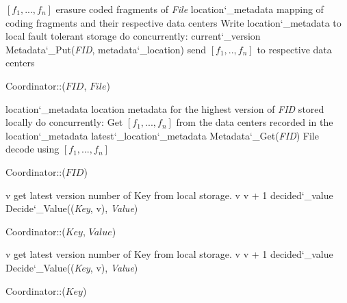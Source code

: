 
\begin{algorithm}
  \DontPrintSemicolon
  $[f_1, ..., f_n]$ \LAR erasure coded fragments of {\em File}\;
  location\char`_metadata \LAR mapping of coding fragments and their respective data centers\;
  Write location\char`_metadata to local fault tolerant storage\;
  do concurrently:\;
  current\char`_version \LAR Metadata\char`_Put({\em FID}, metadata\char`_location)\;
  send $[f_1, .., f_n]$ to respective data centers\;
   {
  } 
  \caption{Coordinator::($FID$, $File$) }
  \label{alg:coordinator}
\end{algorithm}

\begin{algorithm}
  \DontPrintSemicolon
  location\char`_metadata \LAR location metadata for the highest version of {\em FID} stored locally\;
  do concurrently:\;
  Get $[f_1, ..., f_n]$ from the data centers recorded in the location\char`_metadata\;
  latest\char`_location\char`_metadata \LAR Metadata\char`_Get({\em FID})\;
   {
    File \LAR decode using $[f_1, ..., f_n]$\;
    \;
  } 
  \caption{Coordinator::($FID$) }
  \label{alg:coordinator}
\end{algorithm}

\begin{algorithm}
  \DontPrintSemicolon
  v \LAR get latest version number of Key from local storage.\;
   { 
     v \LAR v + 1 \;
     decided\char`_value \LAR Decide\char`_Value(({\em Key}, v), {\em Value})
  }
   \;
  \caption{Coordinator::($Key$, $Value$)}
\end{algorithm}

\begin{algorithm}
  \DontPrintSemicolon
  v \LAR get latest version number of Key from local storage.\;
   { 
     v \LAR v + 1 \;
     decided\char`_value \LAR Decide\char`_Value(({\em Key}, v), {\em Value})
  }
   \;
  \caption{Coordinator::($Key$)}
\end{algorithm}

